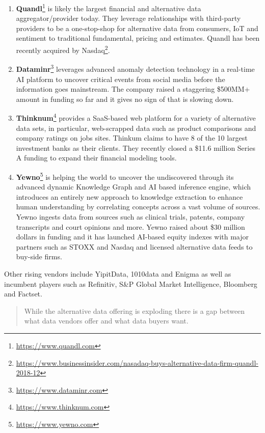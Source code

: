 \documentclass[]{book}
\DeclareRobustCommand{\href}[2]{#2\footnote{\url{#1}}}
\providecommand{\tightlist}{%
  \setlength{\itemsep}{0pt}\setlength{\parskip}{0pt}}
\theoremstyle{definition}
\theoremstyle{definition}
\theoremstyle{definition}
\theoremstyle{remark}
\begin{document}
\begin{enumerate}
\def\labelenumi{\arabic{enumi}.}
\tightlist
\item
  \href{https://www.quandl.com}{\textbf{Quandl}} is likely the largest
  financial and alternative data aggregator/provider today. They
  leverage relationships with third-party providers to be a
  one-stop-shop for alternative data from consumers, IoT and sentiment
  to traditional fundamental, pricing and estimates.
  \href{https://www.businessinsider.com/nasadaq-buys-alternative-data-firm-quandl-2018-12}{Quandl
  has been recently acquired by Nasdaq}.
\item
  \href{https://www.dataminr.com}{\textbf{Dataminr}} leverages advanced
  anomaly detection technology in a real-time AI platform to uncover
  critical events from social media before the information goes
  mainstream. The company raised a staggering \$500MM+ amount in funding
  so far and it gives no sign of that is slowing down.
\item
  \href{https://www.thinknum.com}{\textbf{Thinknum}} provides a
  SaaS-based web platform for a variety of alternative data sets, in
  particular, web-scrapped data such as product comparisons and company
  ratings on jobs sites. Thinkum claims to have 8 of the 10 largest
  investment banks as their clients. They recently closed a \$11.6
  million Series A funding to expand their financial modeling tools.
\item
  \href{https://www.yewno.com}{\textbf{Yewno}} is helping the world to
  uncover the undiscovered through its advanced dynamic Knowledge Graph
  and AI based inference engine, which introduces an entirely new
  approach to knowledge extraction to enhance human understanding by
  correlating concepts across a vast volume of sources. Yewno ingests
  data from sources such as clinical trials, patents, company
  transcripts and court opinions and more. Yewno raised about \$30
  million dollars in funding and it has launched AI-based equity indexes
  with major partners such as STOXX and Nasdaq and licensed alternative
  data feeds to buy-side firms.
\end{enumerate}

Other rising vendors include YipitData, 1010data and Enigma as well as
incumbent players such as Refinitiv, S\&P Global Market Intelligence,
Bloomberg and Factset.

\begin{quote}
While the alternative data offering is exploding there is a gap between
what data vendors offer and what data buyers want.
\end{quote}
\end{document}
